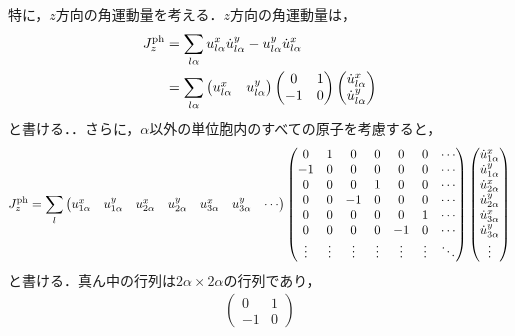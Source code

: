 \documentclass{report}
\begin{document}
特に，$z$方向の角運動量を考える．$z$方向の角運動量は，
\begin{align}
  J_z^{\mathrm{ph}} &= \sum_{l\alpha} u_{l\alpha}^{x} \dot{u}_{l\alpha}^{y} - u_{l\alpha}^{y} \dot{u}_{l\alpha}^{x}\\
  &= \sum_{l\alpha}
  \begin{pmatrix}
    u_{l\alpha}^{x} & u_{l\alpha}^{y}
  \end{pmatrix}
  \begin{pmatrix}
    0 & 1\\
    -1 & 0
  \end{pmatrix}
  \begin{pmatrix}
    \dot{u}_{l\alpha}^{x}\\
    \dot{u}_{l\alpha}^{y}
  \end{pmatrix}
\end{align}
と書ける．．さらに，$\alpha$以外の単位胞内のすべての原子を考慮すると，
\begin{align}
  J_z^{\mathrm{ph}} = \sum_{l}
  \begin{pmatrix}
    u_{1\alpha}^{x} & u_{1\alpha}^{y} & u_{2\alpha}^{x} & u_{2\alpha}^{y} & u_{3\alpha}^{x} & u_{3\alpha}^{y} & \cdots
  \end{pmatrix}
  \begin{pmatrix}
    0 & 1 & 0 & 0 & 0 & 0 & \cdots\\
    -1 & 0 & 0 & 0 & 0 & 0 & \cdots\\
    0 & 0 & 0 & 1 & 0 & 0 & \cdots\\
    0 & 0 & -1 & 0 & 0 & 0 & \cdots\\
    0 & 0 & 0 & 0 & 0 & 1 & \cdots\\
    0 & 0 & 0 & 0 & -1 & 0 & \cdots\\
    \vdots & \vdots & \vdots & \vdots & \vdots & \vdots & \ddots
  \end{pmatrix}
  \begin{pmatrix}
    \dot{u}_{1\alpha}^{x}\\
    \dot{u}_{1\alpha}^{y}\\
    \dot{u}_{2\alpha}^{x}\\
    \dot{u}_{2\alpha}^{y}\\
    \dot{u}_{3\alpha}^{x}\\
    \dot{u}_{3\alpha}^{y}\\
    \vdots
  \end{pmatrix}
\end{align}
と書ける．真ん中の行列は$2\alpha\times2\alpha$の行列であり，
\begin{align}
  \begin{pmatrix}
    0 & 1\\
    -1 & 0
  \end{pmatrix}
\end{align}
\end{document}
